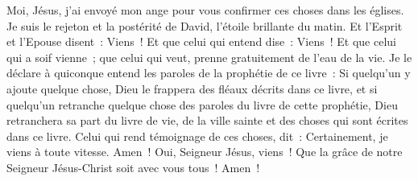 \begin{multicols}{2}
Moi, Jésus, j'ai envoyé mon ange pour vous confirmer ces choses dans les églises. Je suis le rejeton et la postérité de David, l'étoile brillante du matin.
Et l'Esprit et l'Epouse disent~: Viens~! Et que celui qui entend dise~: Viens~! Et que celui qui a soif vienne~; que celui qui veut, prenne gratuitement de l'eau de la vie.
Je le déclare à quiconque entend les paroles de la prophétie de ce livre~: Si quelqu'un y ajoute quelque chose, Dieu le frappera des fléaux décrits dans ce livre,
et si quelqu'un retranche quelque chose des paroles du livre de cette prophétie, Dieu retranchera sa part du livre de vie, de la ville sainte et des choses qui sont écrites dans ce livre.
Celui qui rend témoignage de ces choses, dit~: Certainement, je viens à toute vitesse. Amen~! Oui, Seigneur Jésus, viens~!
Que la grâce de notre Seigneur Jésus-Christ soit avec vous tous~! Amen~!
\PPE{}
\end{multicols}
